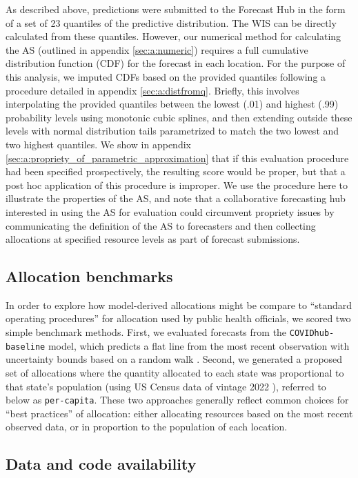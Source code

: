\documentclass{article}\usepackage[]{graphicx}\usepackage[]{xcolor}
\begin{document}
As described above, predictions were submitted to the Forecast Hub in the form of a set of 23 quantiles of the
predictive distribution. The WIS can be directly calculated from these quantiles. However, our numerical method for calculating 
the AS (outlined in appendix \ref{sec:a:numeric})
requires a full cumulative distribution function (CDF) for the forecast in each location.
For the purpose of this analysis, we imputed CDFs based on the provided quantiles following a procedure detailed in 
appendix \ref{sec:a:distfromq}. Briefly, this involves interpolating the provided quantiles between the lowest (.01) and highest 
(.99) probability levels using monotonic cubic splines, and then extending outside these levels with normal distribution tails
parametrized to match the two lowest and two highest quantiles. We show in appendix \ref{sec:a:propriety_of_parametric_approximation}
that if this evaluation procedure
had been specified prospectively, the resulting score would be proper, but that a post hoc application of this
procedure is improper. We use the procedure here to illustrate the properties of the AS, and note that a collaborative
forecasting hub interested in using the AS for evaluation could circumvent propriety issues by communicating the
definition of the AS to forecasters and then collecting allocations at specified resource levels as part of forecast
submissions.

\subsection{Allocation benchmarks}

In order to explore how model-derived allocations might be compare to ``standard operating procedures'' for allocation
used by public health officials, we scored two simple benchmark methods. First, we evaluated forecasts from the
\texttt{COVIDhub-baseline} model, which predicts a flat line from the most recent observation with uncertainty bounds
based on a random walk \citep{cramer_evaluation_2022}. Second, we generated a proposed set of allocations where the
quantity allocated to each state was proportional to that state's population (using US Census data of vintage 2022
\citep{us_census_nst_est2022}), referred to below as \texttt{per-capita}. These two approaches generally reflect common
choices for ``best practices'' of allocation: either allocating resources based on the most recent observed data, or in
proportion to the population of each location. 

\subsection{Data and code availability}
\end{document}
